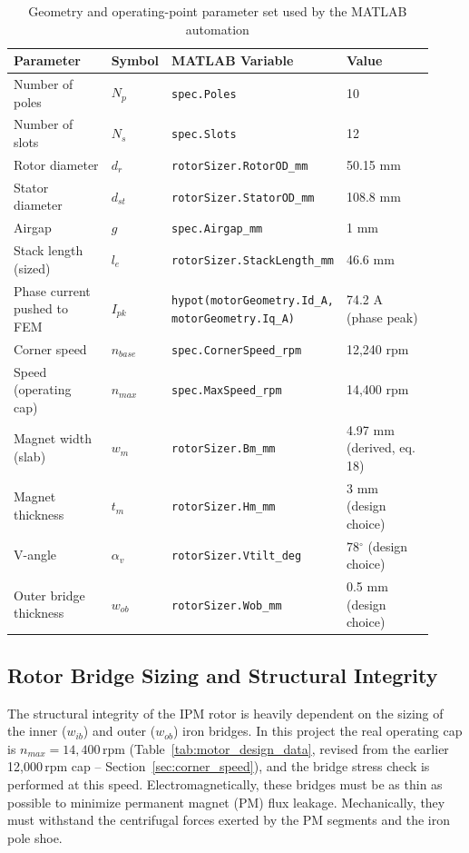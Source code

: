\documentclass[11pt,a4paper]{article}
\begin{document}
\begin{table}[H]
\centering
\caption{Geometry and operating-point parameter set used by the MATLAB automation}
\label{tab:comsol_param_set}
\begin{tabular}{@{}p{0.24\linewidth}p{0.11\linewidth}p{0.35\linewidth}p{0.22\linewidth}@{}}
\toprule
\textbf{Parameter} & \textbf{Symbol} & \textbf{MATLAB Variable} & \textbf{Value} \\
\midrule
Number of poles & $N_p$ & \texttt{spec.Poles} & 10 \\
Number of slots & $N_s$ & \texttt{spec.Slots} & 12 \\
Rotor diameter & $d_r$ & \texttt{rotorSizer.RotorOD\_mm} & 50.15 mm \\
Stator diameter & $d_{st}$ & \texttt{rotorSizer.StatorOD\_mm} & 108.8 mm \\
Airgap & $g$ & \texttt{spec.Airgap\_mm} & 1 mm \\
Stack length (sized) & $l_e$ & \texttt{rotorSizer.StackLength\_mm} & 46.6 mm \\
Phase current pushed to FEM & $I_{pk}$ & \texttt{hypot(motorGeometry.Id\_A, motorGeometry.Iq\_A)} & 74.2 A (phase peak) \\
Corner speed & $n_{base}$ & \texttt{spec.CornerSpeed\_rpm} & 12,240 rpm \\
Speed (operating cap) & $n_{max}$ & \texttt{spec.MaxSpeed\_rpm} & 14,400 rpm \\
Magnet width (slab) & $w_m$ & \texttt{rotorSizer.Bm\_mm} & 4.97 mm (derived, eq. 18) \\
Magnet thickness & $t_m$ & \texttt{rotorSizer.Hm\_mm} & 3 mm (design choice) \\
V-angle & $\alpha_v$ & \texttt{rotorSizer.Vtilt\_deg} & 78$^\circ$ (design choice) \\
Outer bridge thickness & $w_{ob}$ & \texttt{rotorSizer.Wob\_mm} & 0.5 mm (design choice) \\
\bottomrule
\end{tabular}
\end{table}

\subsection{Rotor Bridge Sizing and Structural Integrity}
\label{sec:bridge_sizing}
The structural integrity of the IPM rotor is heavily dependent on the sizing of the inner ($w_{ib}$) and outer ($w_{ob}$) iron bridges. In this project the real operating cap is $n_{max}=14{,}400\,\text{rpm}$ (Table~\ref{tab:motor_design_data}, revised from the earlier 12,000\,rpm cap -- Section~\ref{sec:corner_speed}), and the bridge stress check is performed at this speed.
Electromagnetically, these bridges must be as thin as possible to minimize permanent magnet (PM) flux leakage. Mechanically, they must withstand the centrifugal forces exerted by the PM segments and the iron pole shoe.
\end{document}
